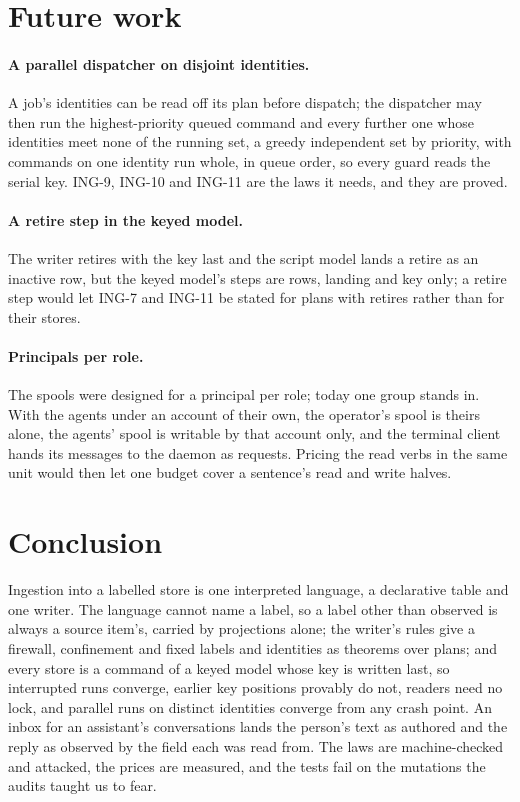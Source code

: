 \documentclass[11pt]{article}
\theoremstyle{plain}
\theoremstyle{definition}
\theoremstyle{remark}
\newcommand{\ing}[1]{ING-#1}
\begin{document}
\section{Future work}

\paragraph{A parallel dispatcher on disjoint identities.}
A job's identities can be read off its plan before dispatch; the dispatcher may then run the
highest-priority queued command and every further one whose identities meet none of the running
set, a greedy independent set by priority, with commands on one identity run whole, in queue
order, so every guard reads the serial key. \ing{9}, \ing{10} and \ing{11} are the laws it
needs, and they are proved.

\paragraph{A retire step in the keyed model.}
The writer retires with the key last and the script model lands a retire as an inactive row,
but the keyed model's steps are rows, landing and key only; a retire step would let \ing{7} and
\ing{11} be stated for plans with retires rather than for their stores.

\paragraph{Principals per role.}
The spools were designed for a principal per role; today one group stands in. With the agents
under an account of their own, the operator's spool is theirs alone, the agents' spool is
writable by that account only, and the terminal client hands its messages to the daemon as
requests. Pricing the read verbs in the same unit would then let one budget cover a sentence's
read and write halves.

\section{Conclusion}

Ingestion into a labelled store is one interpreted language, a declarative table and one writer.
The language cannot name a label, so a label other than observed is always a source item's,
carried by projections alone; the writer's rules give a firewall, confinement and fixed labels
and identities as theorems over plans; and every store is a command of a keyed model whose key
is written last, so interrupted runs converge, earlier key positions provably do not, readers
need no lock, and parallel runs on distinct identities converge from any crash point. An inbox
for an assistant's conversations lands the person's text as authored and the reply as observed
by the field each was read from. The laws are machine-checked and attacked, the prices are
measured, and the tests fail on the mutations the audits taught us to fear.

\renewcommand{\bibfont}{\footnotesize}
\setlength{\bibsep}{3pt}


\end{document}
